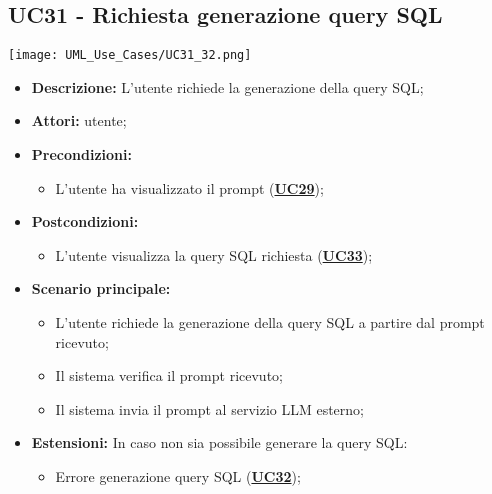\subsection{UC31 - Richiesta generazione query SQL}
\label{sec:UC31}
\texttt{[image: UML\_Use\_Cases/UC31\_32.png]}
\begin{itemize}
    \item \textbf{Descrizione:} L'utente richiede la generazione della query SQL;
    \item \textbf{Attori:} utente;
    \item \textbf{Precondizioni:} 
    \begin{itemize}
    	\item L'utente ha visualizzato il prompt (\hyperref[sec:UC29]{\textbf{UC29}});
    \end{itemize}
    \item \textbf{Postcondizioni:} 
    \begin{itemize}
    	\item L'utente visualizza la query SQL richiesta (\hyperref[sec:UC33]{\textbf{UC33}});
    \end{itemize}
    \item \textbf{Scenario principale:}
    \begin{itemize}
    	\item L'utente richiede la generazione della query SQL a partire dal prompt ricevuto;
    	\item Il sistema verifica il prompt ricevuto;
    	\item Il sistema invia il prompt al servizio LLM esterno;
    \end{itemize}
    \item \textbf{Estensioni:} In caso non sia possibile generare la query SQL:
    \begin{itemize}
    	\item Errore generazione query SQL (\hyperref[sec:UC32]{\textbf{UC32}});
    \end{itemize}
\end{itemize}

